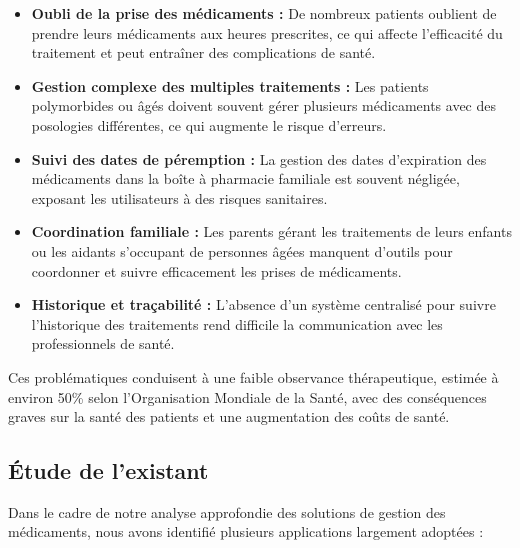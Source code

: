 \begin{itemize}
    \item \textbf{Oubli de la prise des médicaments :} De nombreux patients oublient de prendre leurs médicaments aux heures prescrites, ce qui affecte l'efficacité du traitement et peut entraîner des complications de santé.

    \item \textbf{Gestion complexe des multiples traitements :} Les patients polymorbides ou âgés doivent souvent gérer plusieurs médicaments avec des posologies différentes, ce qui augmente le risque d'erreurs.

    \item \textbf{Suivi des dates de péremption :} La gestion des dates d'expiration des médicaments dans la boîte à pharmacie familiale est souvent négligée, exposant les utilisateurs à des risques sanitaires.

    \item \textbf{Coordination familiale :} Les parents gérant les traitements de leurs enfants ou les aidants s'occupant de personnes âgées manquent d'outils pour coordonner et suivre efficacement les prises de médicaments.

    \item \textbf{Historique et traçabilité :} L'absence d'un système centralisé pour suivre l'historique des traitements rend difficile la communication avec les professionnels de santé.
\end{itemize}

Ces problématiques conduisent à une faible observance thérapeutique, estimée à environ 50\% selon l'Organisation Mondiale de la Santé, avec des conséquences graves sur la santé des patients et une augmentation des coûts de santé.

\subsection{Étude de l'existant}
Dans le cadre de notre analyse approfondie des solutions de gestion des médicaments, nous avons identifié plusieurs applications largement adoptées :

